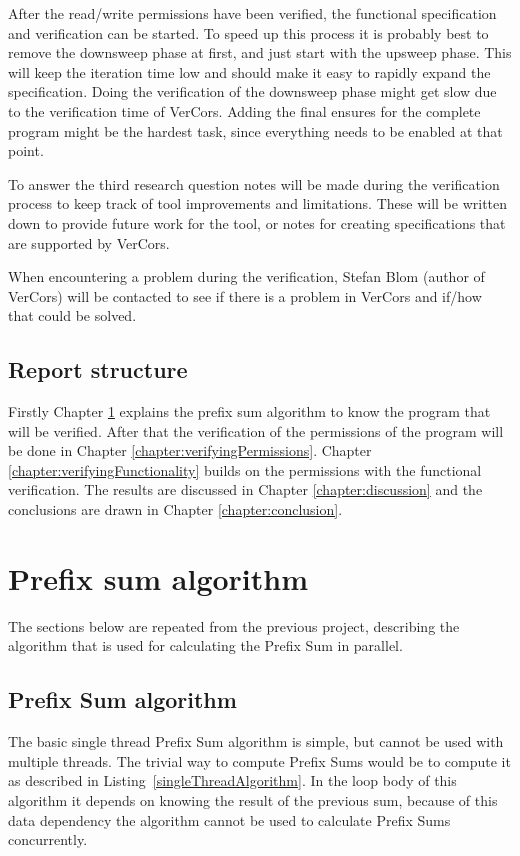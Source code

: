 \documentclass[a4paper]{article}
\begin{document}
After the read/write permissions have been verified, the functional specification and verification can be started. To speed up this process it is probably best to remove the downsweep phase at first, and just start with the upsweep phase. This will keep the iteration time low and should make it easy to rapidly expand the specification. Doing the verification of the downsweep phase might get slow due to the verification time of VerCors. Adding the final ensures for the complete program might be the hardest task, since everything needs to be enabled at that point.

To answer the third research question notes will be made during the verification process to keep track of tool improvements and limitations. These will be written down to provide future work for the tool, or notes for creating specifications that are supported by VerCors.

When encountering a problem during the verification, Stefan Blom (author of VerCors) will be contacted to see if there is a problem in VerCors and if/how that could be solved.

\subsection{Report structure}
Firstly Chapter \ref{chapter:prefixSum} explains the prefix sum algorithm to know the program that will be verified. After that the verification of the permissions of the program will be done in Chapter \ref{chapter:verifyingPermissions}. Chapter \ref{chapter:verifyingFunctionality} builds on the permissions with the functional verification. The results are discussed in Chapter \ref{chapter:discussion} and the conclusions are drawn in Chapter \ref{chapter:conclusion}.


\section{Prefix sum algorithm}\label{chapter:prefixSum}
The sections below are repeated from the previous project\cite{bachelorThesis}, describing the algorithm that is used for calculating the Prefix Sum in parallel.

\subsection{Prefix Sum algorithm} \label{implementBasic}
The basic single thread Prefix Sum algorithm is simple, but cannot be used with multiple threads. The trivial way to compute Prefix Sums would be to compute it as described in Listing~\ref{singleThreadAlgorithm}. In the loop body of this algorithm it depends on knowing the result of the previous sum, because of this data dependency the algorithm cannot be used to calculate Prefix Sums concurrently. 
\end{document}
